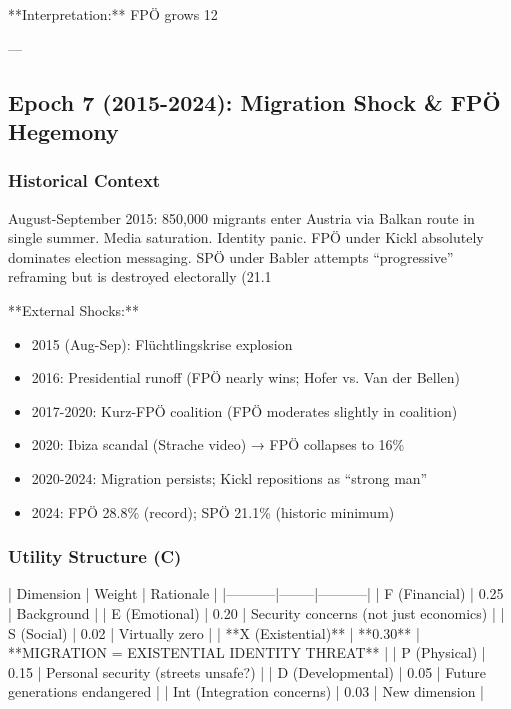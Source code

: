 **Interpretation:** FPÖ grows 12%

---

\subsection{Epoch 7 (2015-2024): Migration Shock \& FPÖ Hegemony}

\subsubsection{Historical Context}

August-September 2015: 850,000 migrants enter Austria via Balkan route in single summer. Media saturation. Identity panic. FPÖ under Kickl absolutely dominates election messaging. SPÖ under Babler attempts ``progressive'' reframing but is destroyed electorally (21.1%

**External Shocks:**
\begin{itemize}
\item 2015 (Aug-Sep): Flüchtlingskrise explosion
\item 2016: Presidential runoff (FPÖ nearly wins; Hofer vs. Van der Bellen)
\item 2017-2020: Kurz-FPÖ coalition (FPÖ moderates slightly in coalition)
\item 2020: Ibiza scandal (Strache video) → FPÖ collapses to 16\%
\item 2020-2024: Migration persists; Kickl repositions as ``strong man''
\item 2024: FPÖ 28.8\% (record); SPÖ 21.1\% (historic minimum)
\end{itemize}

\subsubsection{Utility Structure (C)}

| Dimension | Weight | Rationale |
|-----------|--------|-----------|
| F (Financial) | 0.25 | Background |
| E (Emotional) | 0.20 | Security concerns (not just economics) |
| S (Social) | 0.02 | Virtually zero |
| **X (Existential)** | **0.30** | **MIGRATION = EXISTENTIAL IDENTITY THREAT** |
| P (Physical) | 0.15 | Personal security (streets unsafe?) |
| D (Developmental) | 0.05 | Future generations endangered |
| Int (Integration concerns) | 0.03 | New dimension |

